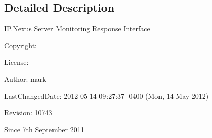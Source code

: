 \subsection{Detailed Description}
\begin{DoxyVerb}         IP.Nexus Server Monitoring Response Interface
\end{DoxyVerb}


\begin{DoxyParagraph}{Copyright\-:}

\end{DoxyParagraph}
\begin{DoxyParagraph}{License\-:}

\end{DoxyParagraph}
\begin{DoxyParagraph}{Author\-:}
mark 
\end{DoxyParagraph}
\begin{DoxyParagraph}{Last\-Changed\-Date\-:}
2012-\/05-\/14 09\-:27\-:37 -\/0400 (Mon, 14 May 2012) 
\end{DoxyParagraph}
\begin{DoxyParagraph}{Revision\-:}
10743 
\end{DoxyParagraph}
\begin{DoxySince}{Since}
7th September 2011 
\end{DoxySince}

